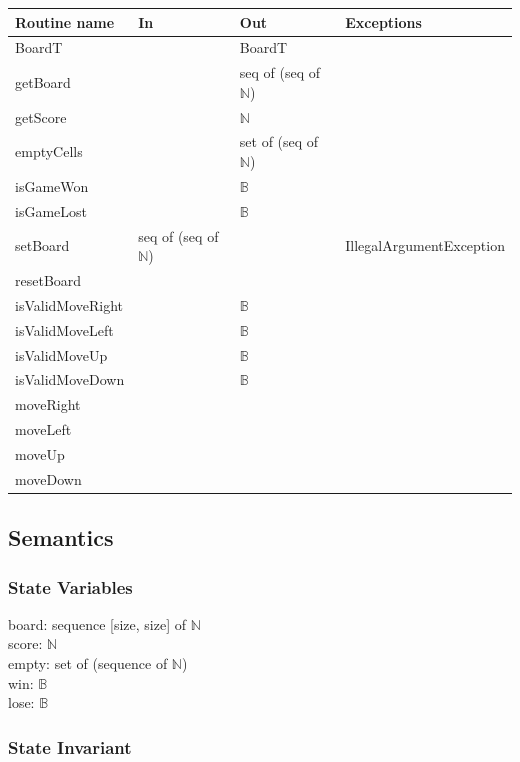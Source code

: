 \documentclass[12pt]{article}
\begin{document}
\begin{tabular}{| l | l | l | l |}
\hline
\textbf{Routine name} & \textbf{In} & \textbf{Out} & \textbf{Exceptions}\\
\hline
BoardT & ~ & BoardT & \\
\hline
getBoard & ~ & seq of (seq of $\mathbb{N}$) & \\
\hline
getScore & ~ & $\mathbb{N}$ & \\
\hline
emptyCells & ~ & set of (seq of $\mathbb{N}$) & \\
\hline
isGameWon & ~ & $\mathbb{B}$ & \\
\hline
isGameLost & ~ & $\mathbb{B}$ & \\
\hline
setBoard & seq of (seq of $\mathbb{N}$) & ~ & IllegalArgumentException\\
\hline
resetBoard  & ~ &  ~     & \\
\hline
isValidMoveRight  & ~ &  $\mathbb{B}$   & \\
\hline
isValidMoveLeft  &  ~  &  $\mathbb{B}$   & \\
\hline
isValidMoveUp  &  ~  &  $\mathbb{B}$   & \\
\hline
isValidMoveDown  &  ~  & $\mathbb{B}$ & \\
\hline
moveRight  & ~  &  ~     & \\
\hline
moveLeft  &  ~ &  ~     & \\
\hline
moveUp  &  ~  &  ~     & \\
\hline
moveDown  &  ~  &  ~     & \\
\hline
\end{tabular}

\subsection* {Semantics}

\subsubsection* {State Variables}

board: sequence [size, size] of $\mathbb{N}$ \\
score: $\mathbb{N}$ \\
empty: set of (sequence of $\mathbb{N}$) \\
win: $\mathbb{B}$ \\
lose: $\mathbb{B}$

\subsubsection* {State Invariant}
\end{document}
